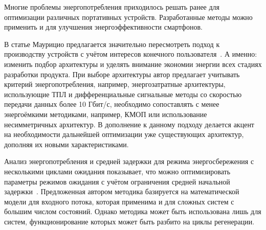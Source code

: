 \documentclass[a4paper,14pt]{extarticle} %
\begin{document}
	Многие проблемы энергопотребления приходилось решать ранее для оптимизации различных портативных устройств. Разработанные методы можно применить и для улучшения энергоэффективности смартфонов. 
	
	В статье Маурицио предлагается значительно пересмотреть подход к производству устройств с учётом интересов конечного пользователя~\parencite{маурицио2008переоценка}. А именно: изменить подбор архитектуры и уделять внимание экономии энергии всех стадиях разработки продукта. При выборе архитектуры автор предлагает учитывать критерий энергопотребления, например, энергозатратные архитектуры, использующие ТПЛ и дифференциальные сигнальные методы со скоростью передачи данных более 10 Гбит/с, необходимо сопоставлять с менее энергоёмкими методиками, например, КМОП или использование несимметричных архитектур. В дополнение к данному подходу делается акцент на необходимости дальнейшей оптимизации уже существующих архитектур, дополняя их новыми характеристиками.
	
	Анализ энергопотребления и средней задержки для режима энергосбережения с несколькими циклами ожидания показывает, что можно оптимизировать параметры режимов ожидания с учётом ограничения средней начальной задержки~\parencite{пустовалов2013анализ}. Предложенная автором методика базируется на математической модели для входного потока, которая применима и для сложных систем с большим числом состояний. Однако методика может быть использована лишь для систем, функционирование которых может быть разбито на циклы регенерации.
	
\end{document}
